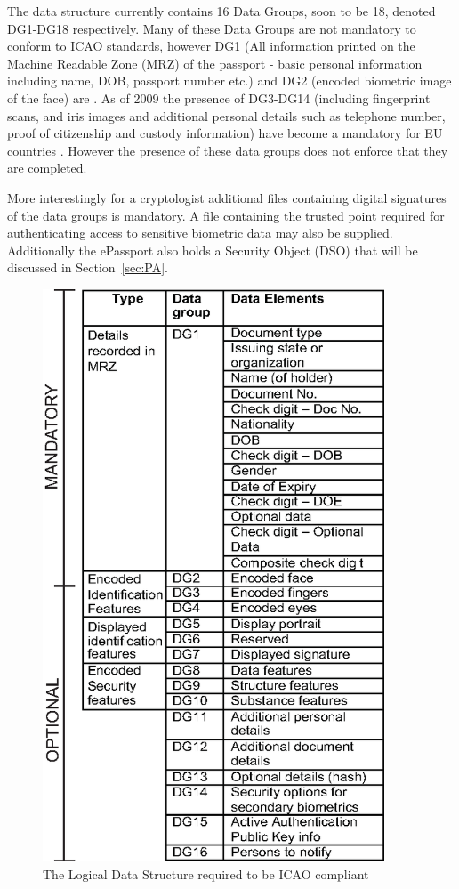 \documentclass[12pt]{article}
\begin{document}
The data structure currently contains 16 Data Groups, soon to be 18, denoted DG1-DG18 respectively. Many of these Data Groups are not mandatory to conform to ICAO standards, however DG1 (All information printed on the Machine Readable Zone (MRZ) of the passport - basic personal information including name, DOB, passport number etc.) and DG2 (encoded biometric image of the face) are \cite{Anonymous:2006vu}. As of 2009 the presence of DG3-DG14 (including fingerprint scans, and iris images and additional personal details such as telephone number, proof of citizenship and custody information) have become a mandatory for EU countries \cite{Anonymous:2011vj}. However the presence of these data groups does not enforce that they are completed.

More interestingly for a cryptologist additional files containing digital signatures of the data groups is mandatory. A file containing the trusted point required for authenticating access to sensitive biometric data may also be supplied. Additionally the ePassport also holds a Security Object (DSO) that will be discussed in Section~\ref{sec:PA}.

\begin{figure}
\centering
\includegraphics[width=4in]{LDS.eps}
\caption{The Logical Data Structure required to be ICAO compliant \cite{Anonymous:2006vu}}
\label{fig:LDS}
\end{figure}
\end{document}
